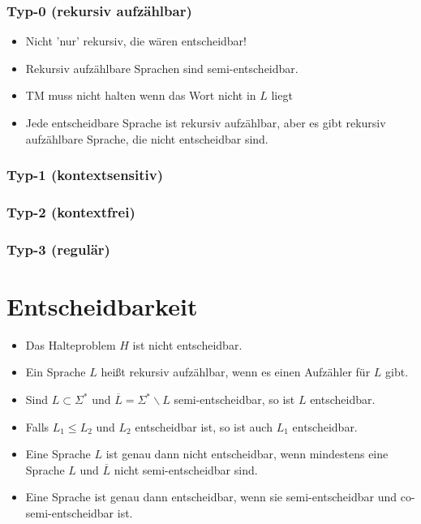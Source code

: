 \subsubsection{Typ-0 (rekursiv aufzählbar)}

\begin{itemize}
	\item Nicht 'nur' rekursiv, die wären entscheidbar!
	\item Rekursiv aufzählbare Sprachen sind semi-entscheidbar.
	\item TM muss nicht halten wenn das Wort nicht in $L$ liegt
	\item Jede entscheidbare Sprache ist rekursiv aufzählbar, aber es gibt rekursiv aufzählbare Sprache, die nicht entscheidbar sind.
\end{itemize}

\subsubsection{Typ-1 (kontextsensitiv)}

\subsubsection{Typ-2 (kontextfrei)}

\subsubsection{Typ-3 (regulär)}


\section{Entscheidbarkeit}

\begin{itemize}
	\item Das Halteproblem $H$ ist nicht entscheidbar.
	\item Ein Sprache $L$ heißt rekursiv aufzählbar, wenn es einen Aufzähler für $L$ gibt.
	\item Sind $L \subset \Sigma^*$ und $\overline{L}=\Sigma^*\backslash L$ semi-entscheidbar, so ist $L$ entscheidbar.
	\item Falls $L_1 \leq L_2$ und $L_2$ entscheidbar ist, so ist auch $L_1$ entscheidbar.
	\item Eine Sprache $L$ ist genau dann nicht entscheidbar, wenn mindestens eine Sprache $L$ und $\overline{L}$ nicht semi-entscheidbar sind.
	\item Eine Sprache ist genau dann entscheidbar, wenn sie semi-entscheidbar und co-semi-entscheidbar ist.
\end{itemize}

